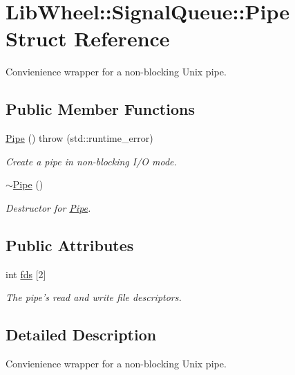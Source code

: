 \hypertarget{structLibWheel_1_1SignalQueue_1_1Pipe}{
\section{\-Lib\-Wheel\-:\-:\-Signal\-Queue\-:\-:\-Pipe \-Struct \-Reference}
\label{structLibWheel_1_1SignalQueue_1_1Pipe}
}


\-Convienience wrapper for a non-\/blocking \-Unix pipe.  


\subsection*{\-Public \-Member \-Functions}
\begin{DoxyCompactItemize}
\item 
\hyperlink{structLibWheel_1_1SignalQueue_1_1Pipe_a27f56c47db1ef822e6a1370b2b65cc59}{\-Pipe} ()  throw (std\-::runtime\-\_\-error)
\begin{DoxyCompactList}\small\item\em \-Create a pipe in non-\/blocking \-I/\-O mode. \end{DoxyCompactList}\item 
\hyperlink{structLibWheel_1_1SignalQueue_1_1Pipe_a505db34d058f095fa5b0adaf12a31bc9}{$\sim$\-Pipe} ()
\begin{DoxyCompactList}\small\item\em \-Destructor for \hyperlink{structLibWheel_1_1SignalQueue_1_1Pipe}{\-Pipe}. \end{DoxyCompactList}\end{DoxyCompactItemize}
\subsection*{\-Public \-Attributes}
\begin{DoxyCompactItemize}
\item 
int \hyperlink{structLibWheel_1_1SignalQueue_1_1Pipe_ad2acca11d1308cf147253e6def4935dc}{fds} \mbox{[}2\mbox{]}
\begin{DoxyCompactList}\small\item\em \-The pipe's read and write file descriptors. \end{DoxyCompactList}\end{DoxyCompactItemize}


\subsection{\-Detailed \-Description}
\-Convienience wrapper for a non-\/blocking \-Unix pipe. 

